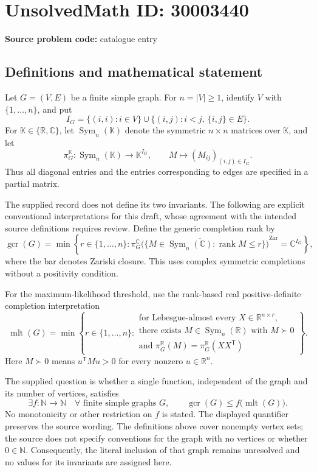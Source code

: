 \documentclass[11pt]{article}
\newcommand{\N}{\mathbb{N}}
\newcommand{\R}{\mathbb{R}}
\newcommand{\C}{\mathbb{C}}
\begin{document}
\section*{UnsolvedMath ID: 30003440}
\textbf{Source problem code:} catalogue entry
\subsection{Definitions and mathematical statement}
Let \(G=(V,E)\) be a finite simple graph. For \(n=|V|\geq 1\), identify \(V\) with \(\{1,\ldots,n\}\), and put
\[
I_G=\{(i,i):i\in V\}\cup\{(i,j):i<j,\ \{i,j\}\in E\}.
\]
For \(\mathbb K\in\{\R,\C\}\), let \(\operatorname{Sym}_n(\mathbb K)\) denote the symmetric \(n\times n\) matrices over \(\mathbb K\), and let
\[
\pi_G^{\mathbb K}:\operatorname{Sym}_n(\mathbb K)\longrightarrow\mathbb K^{I_G},
\qquad M\longmapsto (M_{ij})_{(i,j)\in I_G}.
\]
Thus all diagonal entries and the entries corresponding to edges are specified in a partial matrix.

The supplied record does not define its two invariants. The following are explicit conventional interpretations for this draft, whose agreement with the intended source definitions requires review. Define the generic completion rank by
\[
\operatorname{gcr}(G)=\min\left\{r\in\{1,\ldots,n\}:\overline{\pi_G^{\C}\bigl(\{M\in\operatorname{Sym}_n(\C):\operatorname{rank}M\leq r\}\bigr)}^{\mathrm{Zar}}=\C^{I_G}\right\},
\]
where the bar denotes Zariski closure. This uses complex symmetric completions without a positivity condition.

For the maximum-likelihood threshold, use the rank-based real positive-definite completion interpretation
\[
\operatorname{mlt}(G)=\min\left\{r\in\{1,\ldots,n\}:\begin{array}{l}
\text{for Lebesgue-almost every }X\in\R^{n\times r},\\
\text{there exists }M\in\operatorname{Sym}_n(\R)\text{ with }M\succ0\\
\text{and }\pi_G^{\R}(M)=\pi_G^{\R}(XX^{\mathsf T})
\end{array}\right\}.
\]
Here \(M\succ0\) means \(u^{\mathsf T}Mu>0\) for every nonzero \(u\in\R^n\).

The supplied question is whether a single function, independent of the graph and its number of vertices, satisfies
\[
\exists f:\N\longrightarrow\N\quad
\forall\text{ finite simple graphs }G,\qquad
\operatorname{gcr}(G)\leq f\bigl(\operatorname{mlt}(G)\bigr).
\]
No monotonicity or other restriction on \(f\) is stated. The displayed quantifier preserves the source wording. The definitions above cover nonempty vertex sets; the source does not specify conventions for the graph with no vertices or whether \(0\in\N\). Consequently, the literal inclusion of that graph remains unresolved and no values for its invariants are assigned here.
\end{document}
